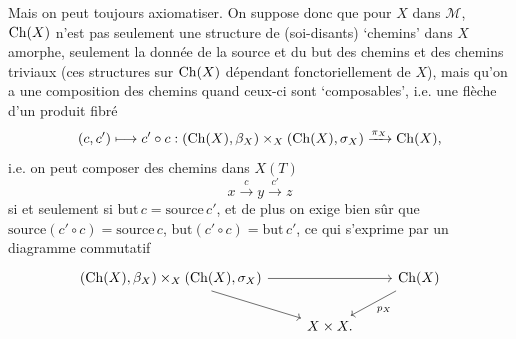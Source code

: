 Mais on peut toujours axiomatiser. On suppose donc que pour $X$ dans $\mathcal{M}$, $\mathrm{Ch}(X)$
n'est pas seulement une structure de (soi-disants) ‘chemins’ dans $X$ amorphe, seulement la donnée de la source et du but des chemins et des chemins triviaux (ces structures sur $\mathrm{Ch}(X)$ dépendant fonctoriellement de $X$), mais qu'on a une composition des chemins quand ceux-ci sont ‘composables’, i.e. une flèche d'un produit fibré
\[
(c,c')\longmapsto c'\circ c : (\mathrm{Ch}(X),\beta_X)\times_X(\mathrm{Ch}(X),\sigma_X)\xrightarrow{\pi_X}\mathrm{Ch}(X),
\]
i.e. on peut composer des chemins dans $X(T)$
\[
x\xrightarrow{c}y\xrightarrow{c'}z
\]
si et seulement si $\text{but}\,c=\text{source}\,c'$, et de plus on exige bien sûr que $\text{source}(c'\circ c)=\text{source}\,c$, $\text{but}(c'\circ c)=\text{but}\,c'$, ce qui s'exprime par un diagramme commutatif
\[
\begin{tikzcd}
(\Ch(X),\beta_X)\times_X(\Ch(X),\sigma_X) \arrow[rr] \arrow[dr] & & \Ch(X) \arrow[dl, "p_X"] \\
 & X\times X. &
\end{tikzcd}
\]

